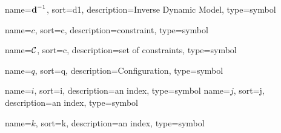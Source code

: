 	{%
		name={\ensuremath{{\vecfunc{d}^{-1}}}},
		sort=d1,
		description=Inverse Dynamic Model,
		type=symbol
	}
	\newcommand{\invdynamicmodel}{\gls{sym:invdynamicmodel}}

	{%
		name=\ensuremath{c},
		sort=c,
		description=constraint,
		type=symbol
	}
	\newcommand{\constraint}{\gls{sym:constraint}}

	{%
		name=\ensuremath{\set{C}},
		sort=c,
		description=set of constraints,
		type=symbol
	}
	\newcommand{\setofconstraints}{\gls{sym:setofconstraints}}

	{%
		name=\ensuremath{q},
		sort=q,
		description=Configuration,
		type=symbol
	}
	\newcommand{\configuration}{\gls{sym:configuration}}

	{%
		name=\ensuremath{i},
		sort=i,
		description=an index,
		type=symbol
	}
	\newcommand{\indexi}{\gls{sym:indexi}}
	{%
		name=\ensuremath{j},
		sort=j,
		description=an index,
		type=symbol
	}
	\newcommand{\indexj}{\gls{sym:indexj}}

	{%
		name=\ensuremath{k},
		sort=k,
		description=an index,
		type=symbol
	}
	\newcommand{\indexk}{\gls{sym:indexk}}

